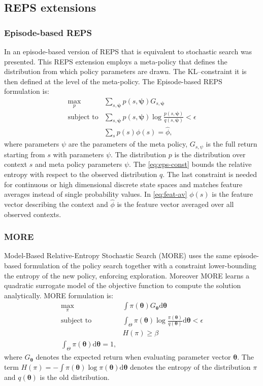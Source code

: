 \subsection{REPS extensions}
\subsubsection{Episode-based REPS}
In \citep{kupcsik_data-efficient_nodate} an episode-based version of REPS that is equivalent to stochastic search was presented. This REPS extension employs a meta-policy that defines the distribution from which policy parameters are drawn. The KL--constraint it is then defined at the level of the meta-policy. 
The Episode-based REPS formulation is:
\begin{align}
	\max_{p} & \sum_{s,\boldsymbol{\psi}} p(s,\boldsymbol{\psi}) G_{s,\boldsymbol{\psi}} \\
	\text{subject to} & \sum_{s,\boldsymbol{\psi}}p(s,\boldsymbol{\psi}) \log \frac{p(s,\boldsymbol{\psi})}{q(s,\boldsymbol{\psi})} < \epsilon \label{eq:eps-const} \\
	& \sum_{s} p(s)\phi(s) = \hat{\phi} \label{eq:feat-av},
\end{align}
where parameters $\psi$ are the parameters of the meta policy, $G_{s,\psi}$ is the full return starting from $s$ with parameters $\psi$. The distribution $p$ is the distribution over context $s$ and meta policy parameters $\psi$. The \cref{eq:eps-const} bounds the relative entropy with respect to the observed distribution $q$. The last constraint is needed for continuous or high dimensional discrete state spaces and matches feature averages instead of single probability values. In \cref{eq:feat-av} $\phi(s)$ is the feature vector describing the context and $\hat{\phi}$ is the feature vector averaged over all observed contexts.
\subsubsection{MORE}
 Model-Based Relative-Entropy Stochastic Search \citep{more} (MORE) uses the same episode-based formulation of the policy search together with a constraint lower-bounding the entropy of the new policy, enforcing exploration. Moreover MORE learns a quadratic surrogate model of the objective function to compute the solution analytically.
 MORE formulation is:
 \begin{align}
	\max_{\pi} & \int \pi(\boldsymbol{\theta})G_{\boldsymbol{\theta}} \mathrm{d}\boldsymbol{\theta} \\
	\text{subject to} & \int_{\Theta} \pi(\boldsymbol{\theta}) \log \frac{\pi(\boldsymbol{\theta})}{q(\boldsymbol{\theta})} \mathrm{d}\boldsymbol{\theta} < \epsilon \\
	& H(\pi) \ge \beta  \\
	\int_{\Theta} \pi(\boldsymbol{\theta}) \mathrm{d}\boldsymbol{\theta} = 1,
\end{align}
where $G_{\boldsymbol{\theta}}$ denotes the expected return when evaluating parameter vector $\boldsymbol{\theta}$. The term $H(\pi) = - \int \pi(\boldsymbol{\theta})\log \pi(\boldsymbol{\theta}) \mathrm{d}\boldsymbol{\theta}$ denotes the entropy of the distribution $\pi$ and $q(\boldsymbol{\theta})$ is the old distribution.
